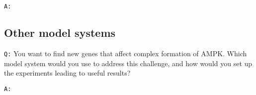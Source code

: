 \documentclass[11pt, a4paper,titlepage]{article}
\begin{document}
\noindent\texttt{A:} 

\subsection*{Other model systems}

\texttt{Q:} You want to find new genes that affect complex formation
of AMPK. Which model system would you use to address this challenge,
and how would you set up the experiments leading to useful results?
\smallskip

\noindent\texttt{A:} 

 
\end{document}
